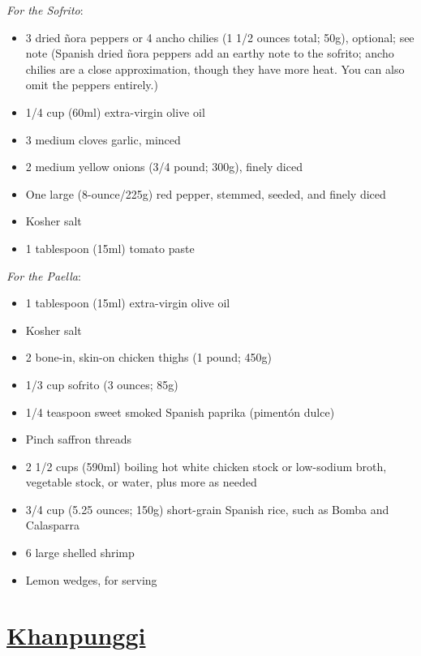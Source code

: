 \documentclass[]{article}
\providecommand{\tightlist}{%
  \setlength{\itemsep}{0pt}\setlength{\parskip}{0pt}}
\begin{document}
\emph{For the Sofrito}:

\begin{itemize}
\tightlist
\item
  3 dried ñora peppers or 4 ancho chilies (1 1/2 ounces total; 50g), optional; see note (Spanish dried ñora peppers add an earthy note to the sofrito; ancho chilies are a close approximation, though they have more heat. You can also omit the peppers entirely.)
\item
  1/4 cup (60ml) extra-virgin olive oil
\item
  3 medium cloves garlic, minced
\item
  2 medium yellow onions (3/4 pound; 300g), finely diced
\item
  One large (8-ounce/225g) red pepper, stemmed, seeded, and finely diced
\item
  Kosher salt
\item
  1 tablespoon (15ml) tomato paste
\end{itemize}

\emph{For the Paella}:

\begin{itemize}
\tightlist
\item
  1 tablespoon (15ml) extra-virgin olive oil
\item
  Kosher salt
\item
  2 bone-in, skin-on chicken thighs (1 pound; 450g)
\item
  1/3 cup sofrito (3 ounces; 85g)
\item
  1/4 teaspoon sweet smoked Spanish paprika (pimentón dulce)
\item
  Pinch saffron threads
\item
  2 1/2 cups (590ml) boiling hot white chicken stock or low-sodium broth, vegetable stock, or water, plus more as needed
\item
  3/4 cup (5.25 ounces; 150g) short-grain Spanish rice, such as Bomba and Calasparra
\item
  6 large shelled shrimp
\item
  Lemon wedges, for serving
\end{itemize}

\hypertarget{khanpunggi}{%
\section{\texorpdfstring{\href{https://www.maangchi.com/recipe/kkanpunggi/comment-page-3}{Khanpunggi}}{Khanpunggi}}\label{khanpunggi}}
\end{document}
